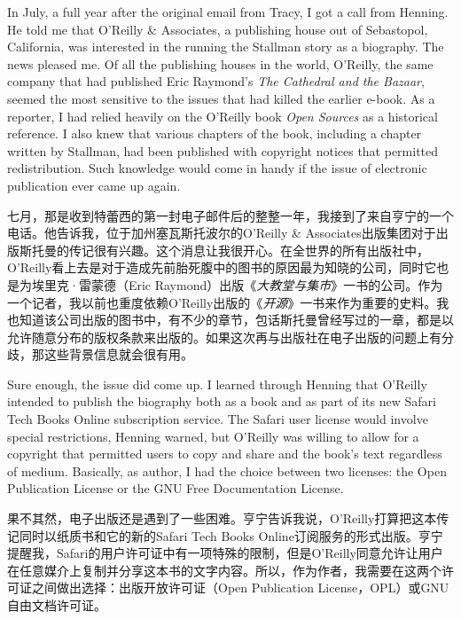 \ifdefined\eng
In July, a full year after the original email from Tracy, I got a call from Henning. He told me that O'Reilly \& Associates, a publishing house out of Sebastopol, California, was interested in the running the Stallman story as a biography. %
The news pleased me. Of all the publishing houses in the world, O'Reilly, the same company that had published Eric Raymond's \textit{The Cathedral and the Bazaar}, seemed the most sensitive to the issues that had killed the earlier e-book. As a reporter, I had relied heavily on the O'Reilly book \textit{Open Sources} as a historical reference. I also knew that various chapters of the book, including a chapter written by Stallman, had been published with copyright notices that permitted redistribution. Such knowledge would come in handy if the issue of electronic publication ever came up again.
\fi

\ifdefined\chs
七月，那是收到特蕾西的第一封电子邮件后的整整一年，我接到了来自亨宁的一个电话。他告诉我，位于加州塞瓦斯托波尔的O'Reilly \& Associates出版集团对于出版斯托曼的传记很有兴趣。这个消息让我很开心。在全世界的所有出版社中，O'Reilly看上去是对于造成先前胎死腹中的图书的原因最为知晓的公司，同时它也是为埃里克·雷蒙德（Eric Raymond）出版《\textit{大教堂与集市}》一书的公司。作为一个记者，我以前也重度依赖O'Reilly出版的《\textit{开源}》一书来作为重要的史料。我也知道该公司出版的图书中，有不少的章节，包话斯托曼曾经写过的一章，都是以允许随意分布的版权条款来出版的。如果这次再与出版社在电子出版的问题上有分歧，那这些背景信息就会很有用。
\fi

\ifdefined\eng
Sure enough, the issue did come up. I learned through Henning that O'Reilly intended to publish the biography both as a book and as part of its new Safari Tech Books Online subscription service. The Safari user license would involve special restrictions, Henning warned, but O'Reilly was willing to allow for a copyright that permitted users to copy and share and the book's text regardless of medium. Basically, as author, I had the choice between two licenses: the Open Publication License or the GNU Free Documentation License.
\fi

\ifdefined\chs
果不其然，电子出版还是遇到了一些困难。亨宁告诉我说，O'Reilly打算把这本传记同时以纸质书和它的新的Safari Tech Books Online订阅服务的形式出版。亨宁提醒我，Safari的用户许可证中有一项特殊的限制，但是O'Reilly同意允许让用户在任意媒介上复制并分享这本书的文字内容。所以，作为作者，我需要在这两个许可证之间做出选择：出版开放许可证（Open Publication License，OPL）或GNU自由文档许可证。
\fi

